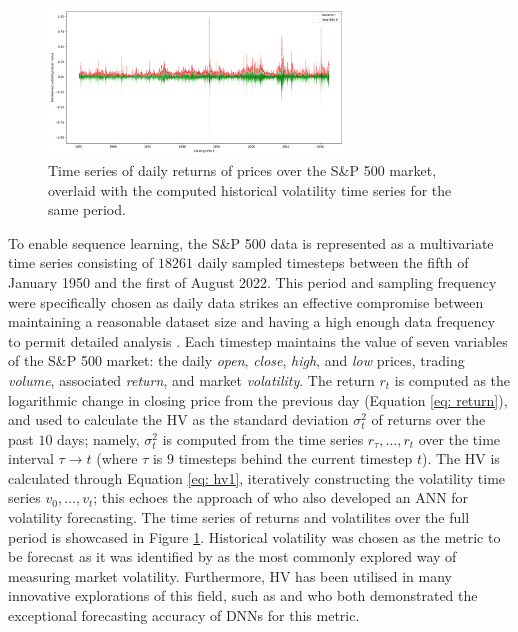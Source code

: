 \documentclass[a4paper, 11pt]{report}
\begin{document}
    \begin{figure}[ht]
        \centering
        \includegraphics[width=0.7\textwidth]{volatility.png}
        \caption{\centering Time series of daily returns of prices over the S\&P 500 market, overlaid with the computed historical volatility time series for the same period.}
        \label{fig: ret-vol}
    \end{figure}

    To enable sequence learning, the S\&P 500 data is represented as a multivariate time series consisting of $18261$ daily sampled timesteps between the fifth of January 1950 and the first of August 2022. This period and sampling frequency were specifically chosen as daily data strikes an effective compromise between maintaining a reasonable dataset size and having a high enough data frequency to permit detailed analysis \citep{rodikov-2022}. Each timestep maintains the value of seven variables of the S\&P 500 market: the daily \emph{open}, \emph{close}, \emph{high}, and \emph{low} prices, trading \emph{volume}, associated \emph{return}, and market \emph{volatility}. The return $r_t$ is computed as the logarithmic change in closing price from the previous day (Equation \ref{eq: return}), and used to calculate the HV as the standard deviation $\sigma_{t}^2$ of returns over the past $10$ days; namely, $\sigma_{t}^2$ is computed from the time series $r_{\tau}, \ldots, r_{t}$ over the time interval $\tau \to t$ (where $\tau$ is $9$ timesteps behind the current timestep $t$). The HV is calculated through Equation \ref{eq: hv1}, iteratively constructing the volatility time series $v_0, \ldots, v_t$; this echoes the approach of \citet{lahmiri-2017} who also developed an ANN for volatility forecasting. The time series of returns and volatilites over the full period is showcased in Figure \ref{fig: ret-vol}. Historical volatility was chosen as the metric to be forecast as it was identified by \citet{ge-2022} as the most commonly explored way of measuring market volatility. Furthermore, HV has been utilised in many innovative explorations of this field, such as \citet{rahimikia-2020} and \citet{rodikov-2022} who both demonstrated the exceptional forecasting accuracy of DNNs for this metric.
\end{document}
